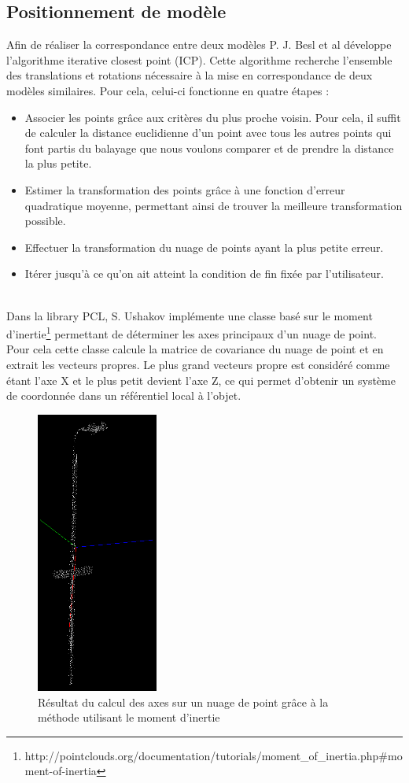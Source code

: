 \subsection{Positionnement de modèle}
Afin de réaliser la correspondance entre deux modèles P. J. Besl et al\cite{ICP} développe l'algorithme \og iterative closest point \fg (ICP).
Cette algorithme recherche l'ensemble des translations et rotations nécessaire à la mise en correspondance de deux modèles similaires. Pour cela,
celui-ci fonctionne en quatre étapes :
\begin{itemize}
  \item Associer les points grâce aux critères du plus proche voisin. Pour cela, il suffit de calculer la distance euclidienne d'un
   point avec tous les autres points qui font partis du balayage que nous voulons comparer et de prendre la distance la plus petite.
  \item Estimer la transformation des points grâce à une fonction d'erreur quadratique moyenne, permettant ainsi de trouver la meilleure
  transformation possible.
  \item Effectuer la transformation du nuage de points ayant la plus petite erreur.
  \item Itérer jusqu'à ce qu'on ait atteint la condition de fin fixée par l'utilisateur.
\end{itemize}
\ \\
Dans la library PCL\cite{PCL}, S. Ushakov implémente une classe basé sur le moment d'inertie\footnote{http://pointclouds.org/documentation/tutorials/moment\_of\_inertia.php\#moment-of-inertia}
permettant de déterminer les axes principaux d'un nuage de point. Pour cela cette classe calcule la matrice de covariance du nuage de point et 
en extrait les vecteurs propres. Le plus grand vecteurs propre est considéré comme étant l'axe X et le plus petit devient l'axe Z, ce qui permet 
d'obtenir un système de coordonnée dans un référentiel local à l'objet.\\   
\begin{figure}[!ht]
  \begin{center}
    \includegraphics[width=4cm]{image/objectAxis.png}
    \caption{Résultat du calcul des axes sur un nuage de point grâce à la méthode utilisant le moment d'inertie}
  \end{center}
\end{figure}
